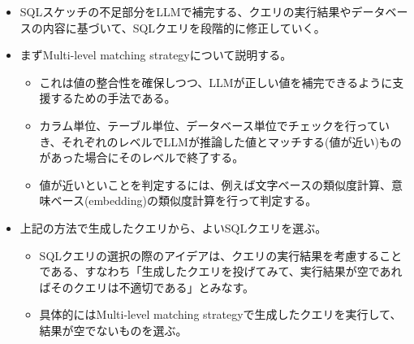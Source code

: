 \documentclass[dvipdfmx,uplatex]{jsarticle}
\theoremstyle{remark}
\newenvironment{method}[1]{
    \begin{tcolorbox}[
        colframe=green!50!black,
        colback=green!50!black!10!white,
        colbacktitle=green!50!black!40!white,
        coltitle=black,
        fonttitle=\bfseries,
        title={#1}
    ]
}{
    \end{tcolorbox}
}
\begin{document}
\begin{method}{SQLクエリの補完と修正}
\begin{itemize}
    \item SQLスケッチの不足部分をLLMで補完する、クエリの実行結果やデータベースの内容に基づいて、SQLクエリを段階的に修正していく。
    \item まずMulti-level matching strategyについて説明する。
    \begin{itemize}
        \item これは値の整合性を確保しつつ、LLMが正しい値を補完できるように支援するための手法である。
        \item カラム単位、テーブル単位、データベース単位でチェックを行っていき、それぞれのレベルでLLMが推論した値とマッチする(値が近い)ものがあった場合にそのレベルで終了する。
        \item 値が近いといことを判定するには、例えば文字ベースの類似度計算、意味ベース(embedding)の類似度計算を行って判定する。
    \end{itemize}
    \item 上記の方法で生成したクエリから、よいSQLクエリを選ぶ。
    \begin{itemize}
        \item SQLクエリの選択の際のアイデアは、クエリの実行結果を考慮することである、すなわち「生成したクエリを投げてみて、実行結果が空であればそのクエリは不適切である」とみなす。
        \item 具体的にはMulti-level matching strategyで生成したクエリを実行して、結果が空でないものを選ぶ。 
    \end{itemize}
\end{itemize}
\end{method}
\end{document}
